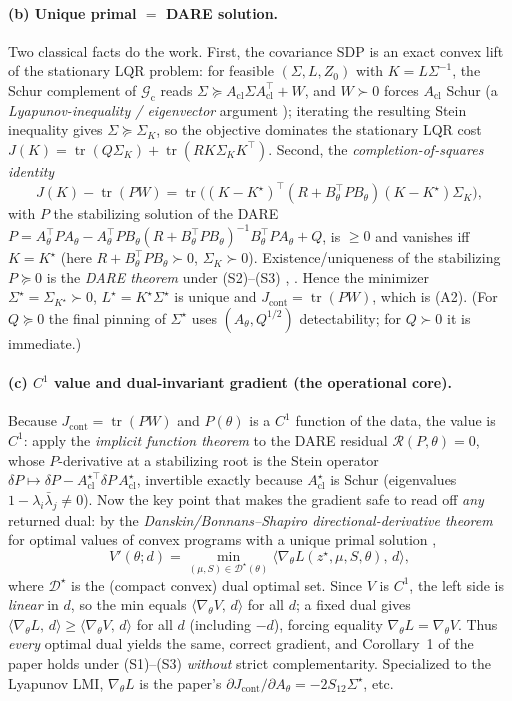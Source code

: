 \documentclass[11pt]{article}
\theoremstyle{definition}
\DeclareMathOperator{\tr}{tr}
\newcommand{\Acl}{A_{\mathrm{cl}}}
\newcommand{\Th}{\theta}
\newcommand{\half}{{1/2}}
\newcommand{\inner}[2]{\langle #1,\, #2\rangle}
\begin{document}
\paragraph{(b) Unique primal $=$ DARE solution.}
Two classical facts do the work. First, the covariance SDP is an exact convex lift
of the stationary LQR problem: for feasible $(\Sigma,L,Z_0)$ with $K=L\Sigma^{-1}$,
the Schur complement of $\mathcal G_{\mathrm c}$ reads
$\Sigma\succeq\Acl\Sigma\Acl^\top+W$, and $W\succ0$ forces $\Acl$ Schur (a
\emph{Lyapunov-inequality / eigenvector} argument \cite[Ch.~5]{BoydLMI}); iterating
the resulting Stein inequality gives $\Sigma\succeq\Sigma_K$, so the objective
dominates the stationary LQR cost $J(K)=\tr(Q\Sigma_K)+\tr(RK\Sigma_KK^\top)$.
Second, the \emph{completion-of-squares identity}
\begin{equation}\label{eq:cos}
J(K)-\tr(PW)=\tr\!\big((K-K^\star)^\top(R+B_\Th^\top PB_\Th)(K-K^\star)\Sigma_K\big),
\end{equation}
with $P$ the stabilizing solution of the DARE
$P=A_\Th^\top PA_\Th-A_\Th^\top PB_\Th(R+B_\Th^\top PB_\Th)^{-1}B_\Th^\top PA_\Th+Q$,
is $\ge0$ and vanishes iff $K=K^\star$ (here $R+B_\Th^\top PB_\Th\succ0$,
$\Sigma_K\succ0$). Existence/uniqueness of the stabilizing $P\succeq0$ is the
\emph{DARE theorem} under (S2)--(S3) \cite[Ch.~14--15]{LancasterRodman},%
\cite[Ch.~6]{AndersonMoore}. Hence the minimizer $\Sigma^\star=\Sigma_{K^\star}
\succ0$, $L^\star=K^\star\Sigma^\star$ is unique and $J_{\mathrm{cont}}=\tr(PW)$,
which is (A2). (For $Q\succeq0$ the final pinning of $\Sigma^\star$ uses
$(A_\Th,Q^{\half})$ detectability; for $Q\succ0$ it is immediate.)

\paragraph{(c) $C^1$ value and dual-invariant gradient (the operational core).}
Because $J_{\mathrm{cont}}=\tr(PW)$ and $P(\Th)$ is a $C^1$ function of the data,
the value is $C^1$: apply the \emph{implicit function theorem} to the DARE residual
$\mathcal R(P,\Th)=0$, whose $P$-derivative at a stabilizing root is the Stein
operator $\delta P\mapsto\delta P-\Acl^{\star\top}\delta P\,\Acl^\star$, invertible
exactly because $\Acl^\star$ is Schur (eigenvalues $1-\lambda_i\bar\lambda_j\neq0$).
Now the key point that makes the gradient safe to read off \emph{any} returned dual:
by the \emph{Danskin/Bonnans--Shapiro directional-derivative theorem} for optimal
values of convex programs with a unique primal solution
\cite[Thm.~4.24]{BonnansShapiro},
\[
V'(\Th;d)=\min_{(\mu,S)\in\mathcal D^\star(\Th)}
\inner{\nabla_\Th L(z^\star,\mu,S,\Th)}{d},
\]
where $\mathcal D^\star$ is the (compact convex) dual optimal set. Since $V$ is
$C^1$, the left side is \emph{linear} in $d$, so the min equals
$\inner{\nabla_\Th V}{d}$ for all $d$; a fixed dual gives
$\inner{\nabla_\Th L}{d}\ge\inner{\nabla_\Th V}{d}$ for all $d$ (including $-d$),
forcing equality $\nabla_\Th L=\nabla_\Th V$. Thus \emph{every} optimal dual yields
the same, correct gradient, and Corollary~1 of the paper holds under
(S1)--(S3) \emph{without} strict complementarity. Specialized to the Lyapunov LMI,
$\nabla_\Th L$ is the paper's $\partial J_{\mathrm{cont}}/\partial A_\Th=-2S_{12}
\Sigma^\star$, etc.
\end{document}
